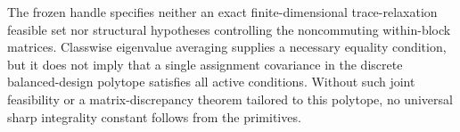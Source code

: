 The frozen handle specifies neither an exact finite-dimensional trace-relaxation feasible set nor structural hypotheses controlling the noncommuting within-block matrices. Classwise eigenvalue averaging supplies a necessary equality condition, but it does not imply that a single assignment covariance in the discrete balanced-design polytope satisfies all active conditions. Without such joint feasibility or a matrix-discrepancy theorem tailored to this polytope, no universal sharp integrality constant follows from the primitives.